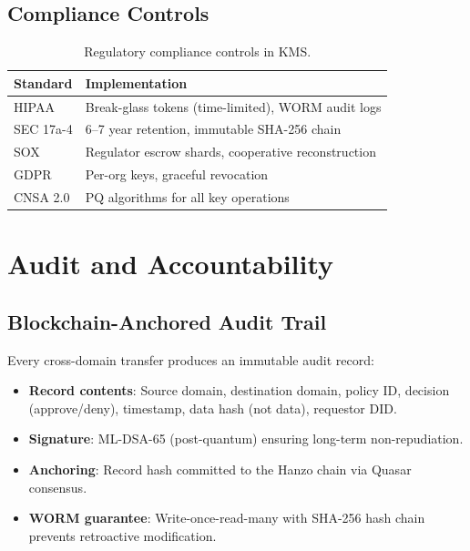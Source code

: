 \documentclass[11pt,letterpaper]{article}
\begin{document}
\subsection{Compliance Controls}

\begin{table}[H]
\centering
\begin{tabular}{@{}lp{6.5cm}@{}}
\toprule
\textbf{Standard} & \textbf{Implementation} \\
\midrule
HIPAA & Break-glass tokens (time-limited), WORM audit logs \\
SEC 17a-4 & 6--7 year retention, immutable SHA-256 chain \\
SOX & Regulator escrow shards, cooperative reconstruction \\
GDPR & Per-org keys, graceful revocation \\
CNSA 2.0 & PQ algorithms for all key operations \\
\bottomrule
\end{tabular}
\caption{Regulatory compliance controls in KMS.}
\label{tab:compliance}
\end{table}

\section{Audit and Accountability}

\subsection{Blockchain-Anchored Audit Trail}

Every cross-domain transfer produces an immutable audit record:

\begin{itemize}
\item \textbf{Record contents}: Source domain, destination domain, policy ID, decision (approve/deny), timestamp, data hash (not data), requestor DID.
\item \textbf{Signature}: ML-DSA-65 (post-quantum) ensuring long-term non-repudiation.
\item \textbf{Anchoring}: Record hash committed to the Hanzo chain via Quasar consensus.
\item \textbf{WORM guarantee}: Write-once-read-many with SHA-256 hash chain prevents retroactive modification.
\end{itemize}
\end{document}

